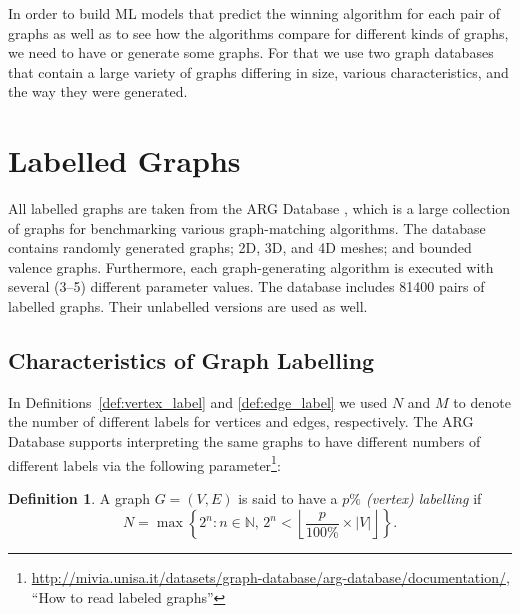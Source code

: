 \documentclass{l4proj}
\theoremstyle{definition}
\newtheorem{definition}{Definition}[chapter]
\theoremstyle{remark}
\begin{document}
In order to build ML models that predict the winning algorithm for each pair of
graphs as well as to see how the algorithms compare for different kinds of
graphs, we need to have or generate some graphs. For that we use two graph
databases that contain a large variety of graphs differing in size, various
characteristics, and the way they were generated.

\section{Labelled Graphs} \label{sec:labelled}

All labelled graphs are taken from the ARG Database \cite{foggia2001-2,
  DBLP:journals/prl/SantoFSV03}, which is a large collection of graphs for
benchmarking various graph-matching algorithms. The database contains randomly
generated graphs; 2D, 3D, and 4D meshes; and bounded valence graphs.
Furthermore, each graph-generating algorithm is executed with several (3--5)
different parameter values. The database includes 81400 pairs of labelled
graphs. Their unlabelled versions are used as well.

\subsection{Characteristics of Graph Labelling} \label{sec:characteristics}

In Definitions~\ref{def:vertex_label} and \ref{def:edge_label} we used $N$ and
$M$ to denote the number of different labels for vertices and edges,
respectively. The ARG Database supports interpreting the same graphs to have
different numbers of different labels via the following
parameter\footnote{\url{http://mivia.unisa.it/datasets/graph-database/arg-database/documentation/},
``How to read labeled graphs''}:

\begin{definition} \label{def:percent_labelling}
  A graph $G = (V, E)$ is said to have a \emph{$p\%$ (vertex) labelling} if
  \[ N = \max \left\{ 2^n : n \in \mathbb{N},\, 2^n < \left\lfloor \frac{p}{100\%}
        \times |V| \right\rfloor \right\}. \]
\end{definition}
\end{document}

